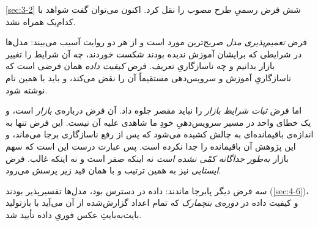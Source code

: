 \cref{sec:3-2} شش فرض رسمیِ طرح مصوب را نقل کرد. اکنون می‌توان گفت شواهد با
کدام‌یک همراه نشد.

فرض \emph{تعمیم‌پذیری مدل} صریح‌ترین مورد است و از هر دو روایت آسیب می‌بیند:
مدل‌ها در شرایطی که برایشان آموزش ندیده بودند شکست خوردند، چه آن شرایط را تغییر
بازار بدانیم و چه ناسازگاریِ تعریف. فرض \emph{کیفیت داده} همان فرضی است که
ناسازگاریِ آموزش و سرویس‌دهی مستقیماً آن را نقض می‌کند، و باید با همین نام
نوشته شود.

اما فرض \emph{ثبات شرایط بازار} را نباید مقصر جلوه داد. آن فرض درباره‌ی
\emph{بازار} است، و یک خطای واحد در مسیر سرویس‌دهیِ خودِ ما شاهدی علیه آن نیست.
این فرض تنها به اندازه‌ی باقیمانده‌ای به چالش کشیده می‌شود که پس از رفع
ناسازگاری برجا می‌ماند، و این پژوهش آن باقیمانده را جدا نکرده است. پس عبارت
درست این است که سهم بازار \emph{به‌طور جداگانه کمّی نشده است}  نه اینکه صفر
است و نه اینکه غالب. فرض \emph{ایستایی} نیز به همین ترتیب و با همان قید زیر
پرسش می‌رود.

سه فرض دیگر پابرجا ماندند: داده در دسترس بود، مدل‌ها تفسیرپذیر بودند
(\cref{sec:4-6})، و کیفیت داده در \emph{دوره‌ی بنچمارک}  که تمام اعداد
گزارش‌شده از آن می‌آید  با بازتولید بایت‌به‌بایتِ عکس فوریِ داده تأیید شد.
